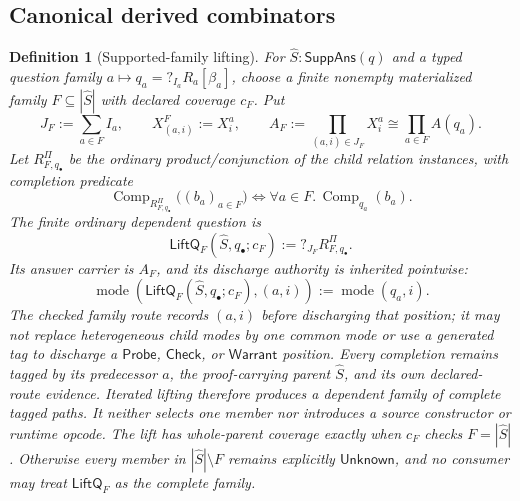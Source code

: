 \documentclass[11pt,oneside]{article}
\newtheorem{definition}{Definition}[section]
\newcommand{\Comp}{\operatorname{Comp}}
\begin{document}
\subsection{Canonical derived combinators}

\begin{definition}[Supported-family lifting]\label{def:supported-family-lifting}
For \(\widehat S:\mathsf{SuppAns}(q)\) and a typed question family
\(a\mapsto q_a=?_{I_a}R_a[\beta_a]\), choose a finite nonempty materialized family
\(F\subseteq|\widehat S|\) with declared coverage \(c_F\).  Put
\[
\boxed{
J_F:=\sum_{a\in F}I_a,
\qquad
X^F_{(a,i)}:=X^a_i,
\qquad
A_F:=\prod_{(a,i)\in J_F}X^a_i
\cong\prod_{a\in F}A(q_a).
}
\]
Let \(R^\Pi_{F,q_\bullet}\) be the ordinary product/conjunction of the child relation instances,
with completion predicate
\[
\boxed{
\Comp_{R^\Pi_{F,q_\bullet}}\!\bigl((b_a)_{a\in F}\bigr)
\iff
\forall a\in F.\,\Comp_{q_a}(b_a).
}
\]
The finite ordinary dependent question is
\[
\boxed{
\mathsf{LiftQ}_F(\widehat S,q_\bullet;c_F)
:=
?_{J_F}R^\Pi_{F,q_\bullet}.
}
\]
Its answer carrier is \(A_F\), and its discharge authority is inherited pointwise:
\[
\boxed{
\operatorname{mode}(\mathsf{LiftQ}_F(\widehat S,q_\bullet;c_F),(a,i))
:=
\operatorname{mode}(q_a,i).
}
\]
The checked family route records \((a,i)\) before discharging that position; it may not replace
heterogeneous child modes by one common mode or use a generated tag to discharge a
\(\mathsf{Probe}\), \(\mathsf{Check}\), or \(\mathsf{Warrant}\) position.
Every completion remains tagged by its predecessor \(a\), the proof-carrying parent
\(\widehat S\), and its own declared-route evidence.  Iterated lifting therefore produces a
dependent family of complete tagged paths.  It neither selects one member nor introduces a source
constructor or runtime opcode.  The lift has whole-parent coverage exactly when \(c_F\) checks
\(F=|\widehat S|\).  Otherwise every member in \(|\widehat S|\setminus F\) remains explicitly
\(\mathsf{Unknown}\), and no consumer may treat \(\mathsf{LiftQ}_F\) as the complete family.
\end{definition}
\end{document}
